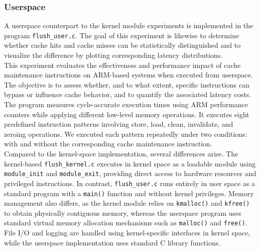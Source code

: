     \subsubsection{Userspace} \label{subsubsec:userspace}
        A userspace counterpart to the kernel module experiments is implemented in the program \texttt{flush\_user.c}. 
        The goal of this experiment is likewise to determine whether 
        cache hits and cache misses can be statistically distinguished and to visualize the difference by plotting 
        corresponding latency distributions.
        \\
        This experiment evaluates the effectiveness and performance impact of cache maintenance instructions on 
        ARM-based systems when executed from userspace. The objective is to assess whether, and to what extent, 
        specific instructions can bypass or influence cache behavior, and to quantify the associated latency costs. 
        The program measures cycle-accurate execution times using ARM performance counters while applying different 
        low-level memory operations. It executes eight predefined instruction patterns involving store, load, clean, 
        invalidate, and zeroing operations. We executed each pattern repeatedly under two conditions: with and 
        without the corresponding cache maintenance instruction.
        \\
        Compared to the kernel-space implementation, several differences arise. The kernel-based \texttt{flush\_kernel.c} 
        executes in kernel space as a loadable module using \texttt{module\_init} and \texttt{module\_exit}, providing direct access 
        to hardware resources and privileged instructions. In contrast, \texttt{flush\_user.c} runs entirely in user space 
        as a standard program with a \texttt{main()} function and without kernel privileges. Memory management also differs, 
        as the kernel module relies on \texttt{kmalloc()} and \texttt{kfree()} to obtain physically contiguous memory, 
        whereas the userspace program uses standard virtual memory allocation mechanisms such as \texttt{malloc()} and \texttt{free()}. 
        File I/O and logging are handled using kernel-specific interfaces in kernel space, while the userspace implementation 
        uses standard C library functions.
